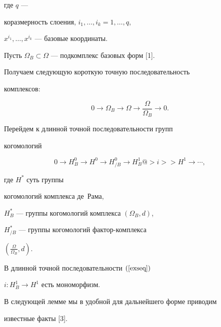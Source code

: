 где $q$ ---


коразмерность слоения, $i_1,\dotsc,i_k=1, \dotsc, q$,


$x^{i_1},\dotsc,x^{i_k}$ --- базовые координаты.





Пусть $\Omega_B \subset \Omega$ --- подкомплекс базовых форм [1].


Получаем следующую короткую точную последовательность


комплексов:


$$


0\to\Omega_B\to \Omega\to


\frac{\Omega}{\Omega_B}\to 0.


$$


Перейдем к длинной точной последовательности групп


когомологий


\begin{equation} \label{exseq}


0\to H^0_B\to H^0\to H^0_{/B}\to


H^1_B @>i>> H^1 \to \dotsb,


\end{equation}


где $H^*$ суть группы


когомологий комплекса де~Рама,


$H^{*}_{B}$ --- группы когомологий комплекса $(\Omega_{B},d)$,


$H^{*}_{/B}$ --- группы когомологий фактор-комплекса


$(\frac{\Omega}{\Omega_B},d)$.





\begin{lem} \label{bbll}


В длинной точной последовательности $(\ref{exseq})$


$i : H^1_B \to H^1$ есть мономорфизм.


\end{lem}





В следующей лемме мы в удобной для дальнейшего форме приводим


известные факты [3].





